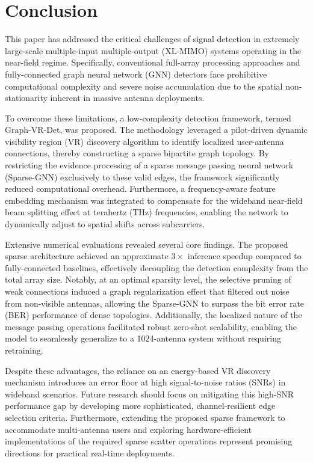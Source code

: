 \section{Conclusion}

This paper has addressed the critical challenges of signal detection in extremely large-scale multiple-input multiple-output (XL-MIMO) systems operating in the near-field regime. Specifically, conventional full-array processing approaches and fully-connected graph neural network (GNN) detectors face prohibitive computational complexity and severe noise accumulation due to the spatial non-stationarity inherent in massive antenna deployments.

To overcome these limitations, a low-complexity detection framework, termed Graph-VR-Det, was proposed. The methodology leveraged a pilot-driven dynamic visibility region (VR) discovery algorithm to identify localized user-antenna connections, thereby constructing a sparse bipartite graph topology. By restricting the evidence processing of a sparse message passing neural network (Sparse-GNN) exclusively to these valid edges, the framework significantly reduced computational overhead. Furthermore, a frequency-aware feature embedding mechanism was integrated to compensate for the wideband near-field beam splitting effect at terahertz (THz) frequencies, enabling the network to dynamically adjust to spatial shifts across subcarriers.

Extensive numerical evaluations revealed several core findings. The proposed sparse architecture achieved an approximate $3\times$ inference speedup compared to fully-connected baselines, effectively decoupling the detection complexity from the total array size. Notably, at an optimal sparsity level, the selective pruning of weak connections induced a graph regularization effect that filtered out noise from non-visible antennas, allowing the Sparse-GNN to surpass the bit error rate (BER) performance of dense topologies. Additionally, the localized nature of the message passing operations facilitated robust zero-shot scalability, enabling the model to seamlessly generalize to a 1024-antenna system without requiring retraining.

Despite these advantages, the reliance on an energy-based VR discovery mechanism introduces an error floor at high signal-to-noise ratios (SNRs) in wideband scenarios. Future research should focus on mitigating this high-SNR performance gap by developing more sophisticated, channel-resilient edge selection criteria. Furthermore, extending the proposed sparse framework to accommodate multi-antenna users and exploring hardware-efficient implementations of the required sparse scatter operations represent promising directions for practical real-time deployments.